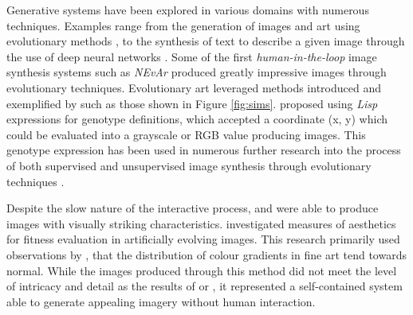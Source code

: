 \documentclass{article}
\begin{document}
Generative systems have been explored in various domains with numerous techniques.
Examples range from the generation of images and art using evolutionary methods \citep{sims, nevar}, to the synthesis of text to describe a given image through the use of deep neural networks \citep{mathews2016senticap}.
Some of the first \textit{human-in-the-loop} image synthesis systems such as \textit{NEvAr} \citep{nevar} produced greatly impressive images through evolutionary techniques.
Evolutionary art leveraged methods introduced and exemplified by \citet{sims} such as those shown in Figure \ref{fig:sims}.
\citet{sims} proposed using \textit{Lisp} expressions for genotype definitions, which accepted a coordinate (x, y) which could be evaluated into a grayscale or RGB value producing images.
This genotype expression has been used in numerous further research into the process of both supervised and unsupervised image synthesis through evolutionary techniques \citep{nevar, sims, den2011evolving, distributed-evolutionary-art, aesthetic-measures}.

Despite the slow nature of the interactive process, \citet{sims} and \citet{nevar} were able to produce images with visually striking characteristics.
\citet{aesthetic-measures} investigated measures of aesthetics for fitness evaluation in artificially evolving images.
This research primarily used observations by \citet{ralph-bell-curve}, that the distribution of colour gradients in fine art tend towards normal.
While the images produced through this method did not meet the level of intricacy and detail as the results of \citet{sims} or \citet{nevar}, it represented a self-contained system able to generate appealing imagery without human interaction.
\end{document}
